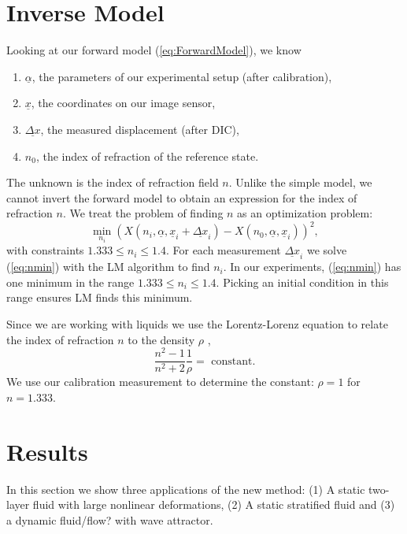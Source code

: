 \documentclass{svjour3}                     %
\begin{document}
\section{Inverse Model}
\label{sec:invmod}
Looking at our forward model (\ref{eq:ForwardModel}), we know
\begin{enumerate}
	\item $\underline{\alpha}$, the parameters of our experimental setup (after calibration), 
	\item $\underline{x}$, the coordinates on our image sensor, 
	\item $\underline{\Delta x}$, the measured displacement (after DIC), 
	\item $n_0$, the index of refraction of the reference state.
\end{enumerate}
The unknown is the index of refraction field $n$. Unlike the simple model, we cannot invert the forward model to obtain an expression for the index of refraction $n$. We treat the problem of finding $n$ as an optimization problem:
\begin{equation}
\label{eq:nmin} 
	\min_{n_i} (X(n_i, \underline{\alpha}, \underline{x}_i+\underline{\Delta x}_i) - X(n_0, \underline{\alpha}, \underline{x}_i))^2, 
\end{equation}
with constraints $1.333 \leq n_i \leq 1.4$. For each measurement $\underline{\Delta x}_i$ we solve (\ref{eq:nmin}) with the LM algorithm to find $n_i$. In our experiments, (\ref{eq:nmin}) has one minimum in the range $1.333 \leq n_i \leq 1.4$. Picking an initial condition in this range ensures LM finds this minimum.

Since we are working with liquids we use the Lorentz-Lorenz equation to relate the index of refraction $n$ to the density $\rho$ \cite{lorentz1916theory, tan2015dependence},
\begin{equation}
 	\frac{n^2-1}{n^2+2} \frac{1}{\rho} = \mbox{ constant}.
\end{equation}
We use our calibration measurement to determine the constant: $\rho=1$ for $n=1.333$.

\section{Results}
\label{sec:res}
In this section we show three applications of the new method: (1) A static two-layer fluid with large nonlinear deformations, (2) A static stratified fluid and (3) a dynamic fluid/flow? with wave attractor.
\end{document}

